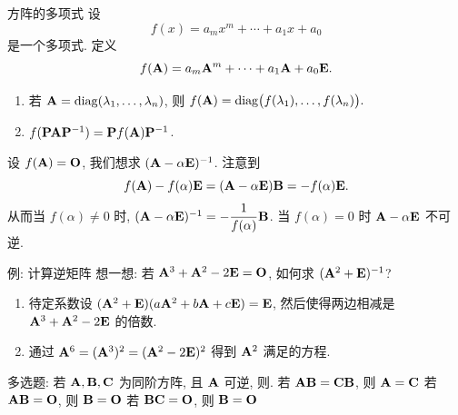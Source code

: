 \begin{frame}{方阵的多项式}
	\onslide<+->
	设
	\[f(x)=a_mx^m+\cdots+a_1x+a_0\]
	是一个多项式.
	\onslide<+->
	定义
	\[f({\mathbf{A}})=a_m{\mathbf{A}}^m+\cdots+a_1{\mathbf{A}}+a_0{\mathbf{E}}.\]
	\vspace{-\baselineskip}
	\begin{enumerate}
		\item 若 ${\mathbf{A}}={\mathrm{diag}}(\lambda_1,\dots,\lambda_n)$, 则 $f({\mathbf{A}})={\mathrm{diag}}\bigl(f(\lambda_1),\dots,f(\lambda_n)\bigr).$
		\item $f({\mathbf{P}}{\mathbf{A}}{\mathbf{P}}^{-1})={\mathbf{P}} f({\mathbf{A}}){\mathbf{P}}^{-1}$.
	\end{enumerate}

	\onslide<+->
	设 $f({\mathbf{A}})={\mathbf{O}}$, 我们想求 $({\mathbf{A}}-\alpha{\mathbf{E}})^{-1}$.
	\onslide<+->
	注意到
	\[f({\mathbf{A}})-f(\alpha){\mathbf{E}}=({\mathbf{A}}-\alpha{\mathbf{E}}){\mathbf{B}}=-f(\alpha){\mathbf{E}}.\]
	\onslide<+->
	从而当 $f(\alpha)\neq 0$ 时, $({\mathbf{A}}-\alpha{\mathbf{E}})^{-1}=-\dfrac1{f(\alpha)}{\mathbf{B}}$.
	当 $f(\alpha)=0$ 时 ${\mathbf{A}}-\alpha{\mathbf{E}}$ 不可逆.
\end{frame}


\begin{frame}{例: 计算逆矩阵}
	\onslide<+->
	想一想: 若 ${\mathbf{A}}^3+{\mathbf{A}}^2-2{\mathbf{E}}={\mathbf{O}}$, 如何求 $({\mathbf{A}}^2+{\mathbf{E}})^{-1}$?
	\begin{enumerate}
		\item 待定系数设 $({\mathbf{A}}^2+{\mathbf{E}})(a{\mathbf{A}}^2+b{\mathbf{A}}+c{\mathbf{E}})={\mathbf{E}}$, 然后使得两边相减是 ${\mathbf{A}}^3+{\mathbf{A}}^2-2{\mathbf{E}}$ 的倍数.
		\item 通过 ${\mathbf{A}}^6=({\mathbf{A}}^3)^2=({\mathbf{A}}^2-2{\mathbf{E}})^2$ 得到 ${\mathbf{A}}^2$ 满足的方程.
	\end{enumerate}
	\onslide<+->
	\begin{example}
		多选题: 若 ${\mathbf{A}},{\mathbf{B}},{\mathbf{C}}$ 为同阶方阵, 且 ${\mathbf{A}}$ 可逆, 则.
		{若 ${\mathbf{A}}{\mathbf{B}}={\mathbf{C}}{\mathbf{B}}$, 则 ${\mathbf{A}}={\mathbf{C}}$}%
		{若 ${\mathbf{A}}{\mathbf{B}}={\mathbf{O}}$, 则 ${\mathbf{B}}={\mathbf{O}}$}%
		{若 ${\mathbf{B}}{\mathbf{C}}={\mathbf{O}}$, 则 ${\mathbf{B}}={\mathbf{O}}$}
	\end{example}
\end{frame}


